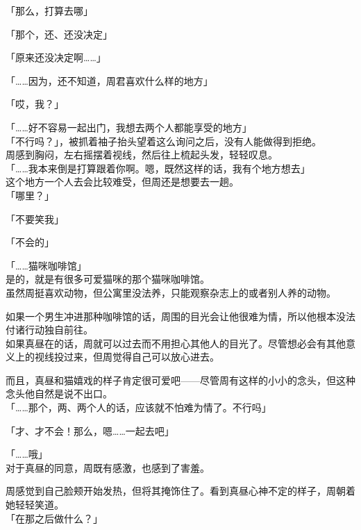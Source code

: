 「那么，打算去哪」

「那个，还、还没决定」

「原来还没决定啊……」

「……因为，还不知道，周君喜欢什么样的地方」

「哎，我？」

「……好不容易一起出门，我想去两个人都能享受的地方」\\

「不行吗？」，被抓着袖子抬头望着这么询问之后，没有人能做得到拒绝。\\

周感到胸闷，左右摇摆着视线，然后往上梳起头发，轻轻叹息。\\

「……我本来倒是打算跟着你啊。嗯，既然这样的话，我有个地方想去」\\

这个地方一个人去会比较难受，但周还是想要去一趟。\\

「哪里？」

「不要笑我」

「不会的」

「……猫咪咖啡馆」\\

是的，就是有很多可爱猫咪的那个猫咪咖啡馆。\\

虽然周挺喜欢动物，但公寓里没法养，只能观察杂志上的或者别人养的动物。

如果一个男生冲进那种咖啡馆的话，周围的目光会让他很难为情，所以他根本没法付诸行动独自前往。\\

如果真昼在的话，周就可以过去而不用担心其他人的目光了。尽管想必会有其他意义上的视线投过来，但周觉得自己可以放心进去。

而且，真昼和猫嬉戏的样子肯定很可爱吧——尽管周有这样的小小的念头，但这种念头他自然是说不出口。\\

「……那个，两、两个人的话，应该就不怕难为情了。不行吗」

「才、才不会！那么，嗯……一起去吧」

「……哦」\\

对于真昼的同意，周既有感激，也感到了害羞。

周感觉到自己脸颊开始发热，但将其掩饰住了。看到真昼心神不定的样子，周朝着她轻轻笑道。\\

「在那之后做什么？」

